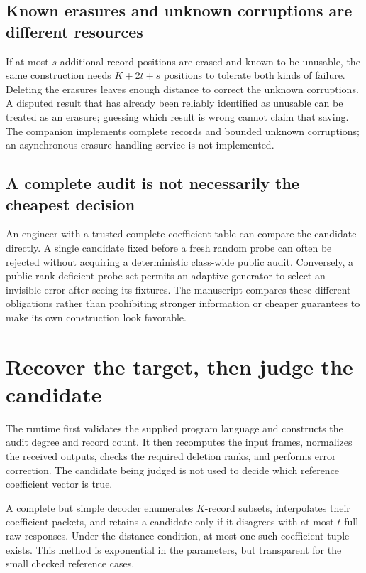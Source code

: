 \documentclass[11pt,letterpaper]{article}
\theoremstyle{remark}\newtheorem{remark}{Remark}[section]
\begin{document}
\subsection{Known erasures and unknown corruptions are different resources}
If at most $s$ additional record positions are erased and known to be unusable, the same construction needs $K+2t+s$ positions to tolerate both kinds of failure. Deleting the erasures leaves enough distance to correct the unknown corruptions. A disputed result that has already been reliably identified as unusable can be treated as an erasure; guessing which result is wrong cannot claim that saving. The companion implements complete records and bounded unknown corruptions; an asynchronous erasure-handling service is not implemented.

\subsection{A complete audit is not necessarily the cheapest decision}
An engineer with a trusted complete coefficient table can compare the candidate directly. A single candidate fixed before a fresh random probe can often be rejected without acquiring a deterministic class-wide public audit. Conversely, a public rank-deficient probe set permits an adaptive generator to select an invisible error after seeing its fixtures. The manuscript compares these different obligations rather than prohibiting stronger information or cheaper guarantees to make its own construction look favorable.

\section{Recover the target, then judge the candidate}
\label{sec:decoder}
The runtime first validates the supplied program language and constructs the audit degree and record count. It then recomputes the input frames, normalizes the received outputs, checks the required deletion ranks, and performs error correction. The candidate being judged is not used to decide which reference coefficient vector is true.

A complete but simple decoder enumerates $K$-record subsets, interpolates their coefficient packets, and retains a candidate only if it disagrees with at most $t$ full raw responses. Under the distance condition, at most one such coefficient tuple exists. This method is exponential in the parameters, but transparent for the small checked reference cases.
\end{document}
